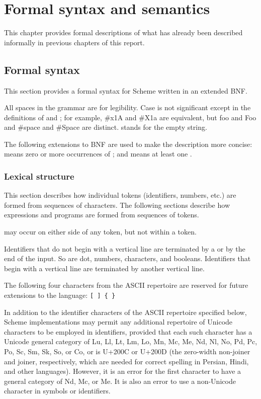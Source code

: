 \chapter{Formal syntax and semantics}
\label{formalchapter}

This chapter provides formal descriptions of what has already been
described informally in previous chapters of this report.



\section{Formal syntax}
\label{BNF}

This section provides a formal syntax for Scheme written in an extended
BNF.

All spaces in the grammar are for legibility.  Case is not significant
except in the definitions of  and ; for example, {\cf \#x1A}
and {\cf \#X1a} are equivalent, but {\cf foo} and {\cf Foo}
and {\cf \#\backwhack{}space} and {\cf \#\backwhack{}Space} are distinct.
 stands for the empty string.

The following extensions to BNF are used to make the description more
concise:   means zero or more occurrences of
; and  means at least one
.


\subsection{Lexical structure}

This section describes how individual tokens (identifiers,
numbers, etc.) are formed from sequences of characters.  The following
sections describe how expressions and programs are formed from sequences
of tokens.

 may occur on either side of any token, but not
within a token.

\vest Identifiers that do not begin with a vertical line are
terminated by a  or by the end of the input.
So are dot, numbers, characters, and booleans.
Identifiers that begin with a vertical line are terminated by another vertical line.

The following four characters from the ASCII repertoire
are reserved for future extensions to the
language: {\tt \verb"[" \verb"]" \verb"{" \verb"}"}

In addition to the identifier characters of the ASCII repertoire specified
below, Scheme implementations may permit any additional repertoire of
Unicode characters to be employed in identifiers,
provided that each such character has a Unicode general category of Lu,
Ll, Lt, Lm, Lo, Mn, Mc, Me, Nd, Nl, No, Pd, Pc, Po, Sc, Sm, Sk, So,
or Co, or is U+200C or U+200D (the zero-width non-joiner and joiner,
respectively, which are needed for correct spelling in Persian, Hindi,
and other languages).
However, it is an error for the first character to have a general category
of Nd, Mc, or Me.  It is also an error to use a non-Unicode character
in symbols or identifiers.

